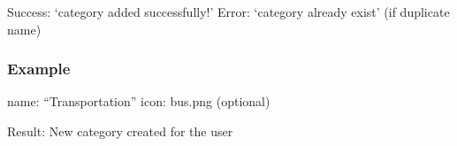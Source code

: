 \documentclass[letterpaper,10pt,english]{sphinxmanual}
\begin{document}
\begin{fulllineitems}
\begin{description}
\sphinxAtStartPar
Success: ‘category added successfully!’
Error: ‘category already exist’ (if duplicate name)

\end{description}
\subsubsection*{Example}
\begin{description}
\sphinxAtStartPar
name: “Transportation”
icon: bus.png (optional)

\end{description}

\sphinxAtStartPar
Result: New category created for the user

\end{fulllineitems}

\end{document}
